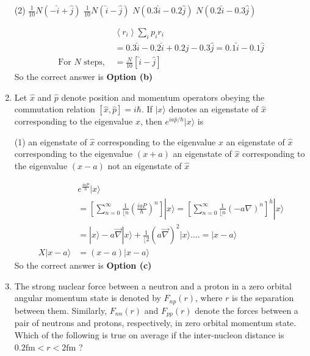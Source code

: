 \begin{enumerate}
 \begin{tasks}(2)
	\task[\textbf{a.}] $\frac{1}{10} N(-\hat{i}+\hat{j})$
	\task[\textbf{b.}]$\frac{1}{10} N(\hat{i}-\hat{j})$
	\task[\textbf{c.}]$N(0.3 \hat{i}-0.2 \hat{j})$
	\task[\textbf{d.}]  $N(0.2 \hat{i}-0.3 \hat{j})$
\end{tasks}
\begin{answer}
	\begin{align*}
	&\left\langle r_{i}\right\rangle \sum_{i} p_{i} r_{i}\\
	&=0.3 \hat{i}-0.2 \hat{i}+0.2 j-0.3 \hat{j}=0.1 \hat{i}-0.1 \hat{j}\\
	\text{For $N$ steps, }&=\frac{N}{10}[\hat{i}-\hat{j}]
	\end{align*}
		So the correct answer is \textbf{Option (b)}
\end{answer}
\item Let $\hat{x}$ and $\hat{p}$ denote position and momentum operators obeying the commutation relation $[\hat{x}, \hat{p}]=i \hbar$. If $|x\rangle$ denotes an eigenstate of $\hat{x}$ corresponding to the eigenvalue $x$, then $e^{i a \hat{p} / \hbar}|x\rangle$ is	
 \begin{tasks}(1)
	\task[\textbf{a.}] an eigenstate of $\hat{x}$ corresponding to the eigenvalue $x$
	\task[\textbf{b.}] an eigenstate of $\hat{x}$ corresponding to the eigenvalue $(x+a)$
	\task[\textbf{c.}]an eigenstate of $\hat{x}$ corresponding to the eigenvalue $(x-a)$
	\task[\textbf{d.}] not an eigenstate of $\hat{x}$	
\end{tasks}
\begin{answer}
	\begin{align*}
	&e^{\frac{i a P}{\hbar}}|x\rangle\\
	&=\left[\sum_{n=0}^{\infty} \frac{1}{\lfloor n}\left(\frac{i a P}{\hbar}\right)^{n}\right]|x\rangle=\left[\sum_{n=0}^{\infty} \frac{1}{\lfloor n}(-a \nabla)^{n}\right]^{h}|x\rangle \\
	&=|x\rangle-a \vec{\nabla}|x\rangle+\frac{1}{\lfloor 2}(a \vec{\nabla})^{2}|x\rangle \ldots .=|x-a\rangle \\
	X|x-a\rangle&=(x-a)|x-a\rangle
	\end{align*}
		So the correct answer is \textbf{Option (c)}
\end{answer}
\item The strong nuclear force between a neutron and a proton in a zero orbital angular momentum state is denoted by $F_{n p}(r)$, where $r$ is the separation between them. Similarly, $F_{n n}(r)$ and $F_{p p}(r)$ denote the forces between a pair of neutrons and protons, respectively, in zero orbital momentum state. Which of the following is true on average if the inter-nucleon distance is $0.2 \mathrm{fm}<r<2 \mathrm{fm}$ ?

\end{enumerate}
